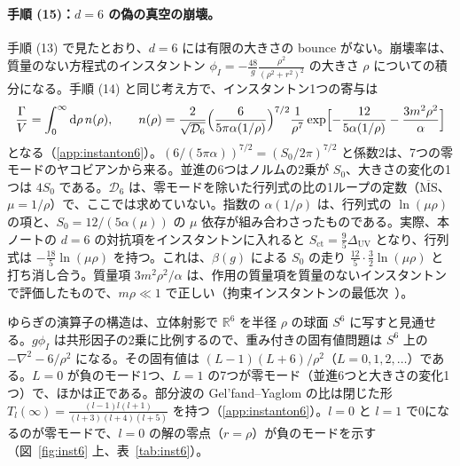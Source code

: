 \documentclass[a4paper,10pt]{ltjsarticle}
\newcommand{\dd}{\mathrm{d}}
\begin{document}
\paragraph{手順 (15)：$d=6$ の偽の真空の崩壊。}手順 (13) で見たとおり、$d=6$ には有限の大きさの bounce がない。崩壊率は、質量のない方程式のインスタントン $\phi_I=-\frac{48}{g}\frac{\rho^2}{(\rho^2+r^2)^2}$ の大きさ $\rho$ についての積分になる。手順 (14) と同じ考え方で、インスタントン1つの寄与は
\begin{equation}
\frac{\Gamma}{V}=\int_0^\infty\dd\rho\,n(\rho),\qquad
n(\rho)=\frac{2}{\sqrt{\mathcal D_6}}\Bigl(\frac{6}{5\pi\alpha(1/\rho)}\Bigr)^{7/2}\frac{1}{\rho^7}\exp\Bigl[-\frac{12}{5\alpha(1/\rho)}-\frac{3m^2\rho^2}{\alpha}\Bigr]
\label{eq:inst6}
\end{equation}
となる（\ref{app:instanton6}）。$(6/(5\pi\alpha))^{7/2}=(S_0/2\pi)^{7/2}$ と係数2は、7つの零モードのヤコビアンから来る。並進の6つはノルムの2乗が $S_0$、大きさの変化の1つは $4S_0$ である。$\mathcal D_6$ は、零モードを除いた行列式の比の1ループの定数（$\overline{\mathrm{MS}}$、$\mu=1/\rho$）で、ここでは求めていない。指数の $\alpha(1/\rho)$ は、行列式の $\ln(\mu\rho)$ の項と、$S_0=12/(5\alpha(\mu))$ の $\mu$ 依存が組み合わさったものである。実際、本ノートの $d=6$ の対抗項をインスタントンに入れると $S_{\mathrm{ct}}=\frac95\Delta_{\mathrm{UV}}$ となり、行列式は $-\frac{18}{5}\ln(\mu\rho)$ を持つ。これは、$\beta(g)$ による $S_0$ の走り $\frac{12}{5}\cdot\frac32\ln(\mu\rho)$ と打ち消し合う。質量項 $3m^2\rho^2/\alpha$ は、作用の質量項を質量のないインスタントンで評価したもので、$m\rho\ll1$ で正しい（拘束インスタントンの最低次~\cite{affleck}）。

ゆらぎの演算子の構造は、立体射影で $\mathbb R^6$ を半径 $\rho$ の球面 $S^6$ に写すと見通せる。$g\phi_I$ は共形因子の2乗に比例するので、重み付きの固有値問題は $S^6$ 上の $-\nabla^2-6/\rho^2$ になる。その固有値は $(L-1)(L+6)/\rho^2$（$L=0,1,2,\dots$）である。$L=0$ が負のモード1つ、$L=1$ の7つが零モード（並進6つと大きさの変化1つ）で、ほかは正である。部分波の Gel'fand--Yaglom の比は閉じた形 $T_l(\infty)=\frac{(l-1)l(l+1)}{(l+3)(l+4)(l+5)}$ を持つ（\ref{app:instanton6}）。$l=0$ と $l=1$ で0になるのが零モードで、$l=0$ の解の零点（$r=\rho$）が負のモードを示す（図~\ref{fig:inst6} 上、表~\ref{tab:inst6}）。
\end{document}
